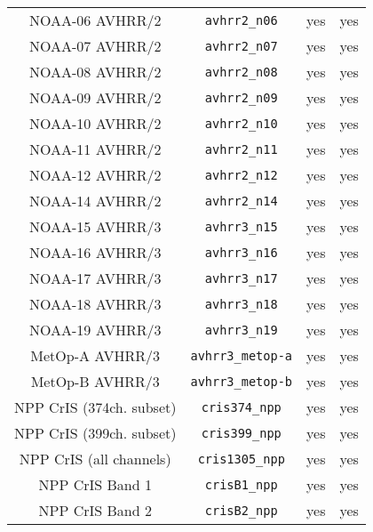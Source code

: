 \begin{center}
\begin{longtable}{c c c c}
  NOAA-06 AVHRR/2                    & \texttt{avhrr2\_n06}         &  yes     &  yes       \\
  NOAA-07 AVHRR/2                    & \texttt{avhrr2\_n07}         &  yes     &  yes       \\
  NOAA-08 AVHRR/2                    & \texttt{avhrr2\_n08}         &  yes     &  yes       \\
  NOAA-09 AVHRR/2                    & \texttt{avhrr2\_n09}         &  yes     &  yes       \\
  NOAA-10 AVHRR/2                    & \texttt{avhrr2\_n10}         &  yes     &  yes       \\
  NOAA-11 AVHRR/2                    & \texttt{avhrr2\_n11}         &  yes     &  yes       \\
  NOAA-12 AVHRR/2                    & \texttt{avhrr2\_n12}         &  yes     &  yes       \\
  NOAA-14 AVHRR/2                    & \texttt{avhrr2\_n14}         &  yes     &  yes       \\
  NOAA-15 AVHRR/3                    & \texttt{avhrr3\_n15}         &  yes     &  yes       \\
  NOAA-16 AVHRR/3                    & \texttt{avhrr3\_n16}         &  yes     &  yes       \\
  NOAA-17 AVHRR/3                    & \texttt{avhrr3\_n17}         &  yes     &  yes       \\
  NOAA-18 AVHRR/3                    & \texttt{avhrr3\_n18}         &  yes     &  yes       \\
  NOAA-19 AVHRR/3                    & \texttt{avhrr3\_n19}         &  yes     &  yes       \\
  MetOp-A AVHRR/3                    & \texttt{avhrr3\_metop-a}     &  yes     &  yes       \\
  MetOp-B AVHRR/3                    & \texttt{avhrr3\_metop-b}     &  yes     &  yes       \\
  NPP CrIS (374ch. subset)           & \texttt{cris374\_npp}        &  yes     &  yes       \\
  NPP CrIS (399ch. subset)           & \texttt{cris399\_npp}        &  yes     &  yes       \\
  NPP CrIS (all channels)            & \texttt{cris1305\_npp}       &  yes     &  yes       \\
  NPP CrIS Band 1                    & \texttt{crisB1\_npp}         &  yes     &  yes       \\
  NPP CrIS Band 2                    & \texttt{crisB2\_npp}         &  yes     &  yes       \\

\end{longtable}
\end{center}
